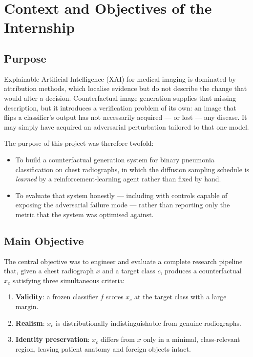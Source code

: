 \section{Context and Objectives of the Internship}

\subsection{Purpose}

Explainable Artificial Intelligence (XAI) for medical imaging is
dominated by attribution methods, which localise evidence but do not
describe the change that would alter a decision. Counterfactual image
generation supplies that missing description, but it introduces a
verification problem of its own: an image that flips a classifier's
output has not necessarily acquired --- or lost --- any disease. It may
simply have acquired an adversarial perturbation tailored to that one
model.

The purpose of this project was therefore twofold:

\begin{itemize}[leftmargin=*]
  \item To build a counterfactual generation system for binary pneumonia
        classification on chest radiographs, in which the diffusion
        sampling schedule is \emph{learned} by a reinforcement-learning
        agent rather than fixed by hand.
  \item To evaluate that system honestly --- including with controls
        capable of exposing the adversarial failure mode --- rather than
        reporting only the metric that the system was optimised against.
\end{itemize}

\subsection{Main Objective}

The central objective was to engineer and evaluate a complete research
pipeline that, given a chest radiograph $x$ and a target class $c$,
produces a counterfactual $x_c$ satisfying three simultaneous criteria:

\begin{enumerate}[leftmargin=*]
  \item \textbf{Validity}: a frozen classifier $f$ scores $x_c$ at the
        target class with a large margin.
  \item \textbf{Realism}: $x_c$ is distributionally indistinguishable
        from genuine radiographs.
  \item \textbf{Identity preservation}: $x_c$ differs from $x$ only in a
        minimal, class-relevant region, leaving patient anatomy and
        foreign objects intact.
\end{enumerate}

